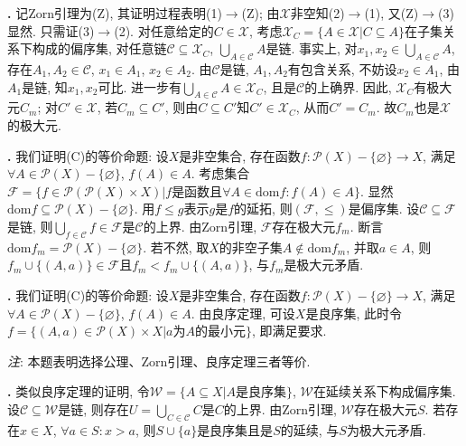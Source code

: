 \par \textbf{\thesolpar .} 记Zorn引理为(Z), 其证明过程表明(1)$\to$(Z); 由$\mathcal{X}$非空知(2)$\to$(1), 又(Z)$\to$(3)显然. 只需证(3)$\to$(2). 对任意给定的$C\in \mathcal{X}$, 考虑$\mathcal{X}_C=\{A\in \mathcal{X}\vert C\subseteq A\}$在子集关系下构成的偏序集, 对任意链$\mathcal{C} \subseteq \mathcal{X}_C$, $\bigcup_{A\in \mathcal{C}} A$是链. 事实上, 对$x_1,x_2\in \bigcup_{A\in \mathcal{C}} A$, 存在$A_1, A_2\in \mathcal{C}$, $x_1\in A_1$, $x_2\in A_2$. 由$\mathcal{C}$是链, $A_1, A_2$有包含关系, 不妨设$x_2\in A_1$, 由$A_1$是链, 知$x_1,x_2$可比. 进一步有$\bigcup_{A\in \mathcal{C}} A\in \mathcal{X}_C$, 且是$\mathcal{C}$的上确界. 因此, $\mathcal{X}_C$有极大元$C_m$; 对$C'\in \mathcal{X}$, 若$C_m\subseteq C'$, 则由$C\subseteq C'$知$C'\in \mathcal{X}_C$, 从而$C'=C_m$. 故$C_m$也是$\mathcal{X}$的极大元. 

\par \textbf{\thesolpar .} \cite{NST} 我们证明(C)的等价命题: 设$X$是非空集合, 存在函数$f:\mathcal{P}(X)-\{\varnothing\}\to X$, 满足$\forall A\in \mathcal{P}(X)-\{\varnothing\}$, $f(A)\in A$. 考虑集合$\mathcal{F}=\{f\in \mathcal{P}(\mathcal{P}(X)\times X)\vert f\text{是函数且}\forall A\in \text{dom}f: f(A)\in A\}$. 显然$\text{dom}f\subseteq \mathcal{P}(X)-\{\varnothing\}$. 用$f\le g$表示$g$是$f$的延拓, 则$(\mathcal{F},\le)$是偏序集. 设$\mathcal{C}\subseteq \mathcal{F}$是链, 则$\bigcup_{f\in \mathcal{C}} f\in \mathcal{F}$是$\mathcal{C}$的上界. 由Zorn引理, $\mathcal{F}$存在极大元$f_m$. 断言$\text{dom}f_m=\mathcal{P}(X)-\{\varnothing\}$. 若不然, 取$X$的非空子集$A\notin \text{dom}f_m$, 并取$a\in A$, 则$f_m \cup \{(A,a)\}\in \mathcal{F}$且$f_m < f_m \cup \{(A,a)\}$, 与$f_m$是极大元矛盾. 

\par \textbf{\thesolpar .} 我们证明(C)的等价命题: 设$X$是非空集合, 存在函数$f:\mathcal{P}(X)-\{\varnothing\}\to X$, 满足$\forall A\in \mathcal{P}(X)-\{\varnothing\}$, $f(A)\in A$. 由良序定理, 可设$X$是良序集, 此时令$f=\{(A,a)\in \mathcal{P}(X)\times X\vert a\text{为}A\text{的最小元}\}$, 即满足要求. 
\par \emph{注}: 本题表明选择公理、Zorn引理、良序定理三者等价. 


\par \textbf{\thesolpar .} 类似良序定理的证明, 令$\mathcal{W}=\{A\subseteq X\vert A\text{是良序集}\}$, $\mathcal{W}$在延续关系下构成偏序集. 设$\mathcal{C}\subseteq \mathcal{W}$是链, 则存在$U=\bigcup_{C\in \mathcal{C}} C$是$C$的上界. 由Zorn引理, $\mathcal{W}$存在极大元$S$. 若存在$x\in X$, $\forall a\in S: x>a$, 则$S\cup \{a\}$是良序集且是$S$的延续, 与$S$为极大元矛盾. 

